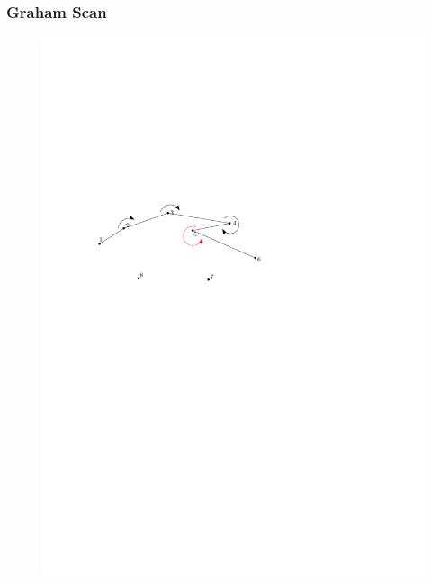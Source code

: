 \begin{frame}
	\frametitle{{Graham Scan}}
\begin{figure}[htbp]
	\begin{center}
  	\includegraphics[width=.8\linewidth]{bilder/scan2}
	\end{center}
\end{figure}
\end{frame}


